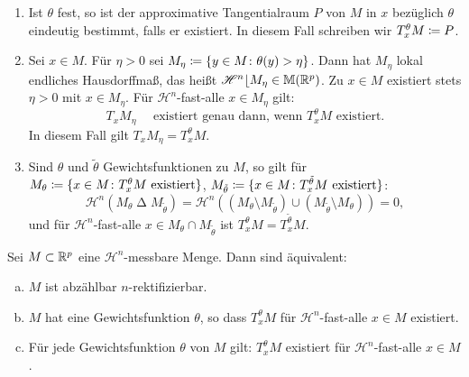 \documentclass[a4paper,twoside,DIV15,BCOR12mm]{scrbook}
\newcommand{\HM}{\mathscr H}
\newcommand{\MR}{\lfloor}
\begin{document}
\begin{bemerkungen}
\begin{enumerate}[(1)]
\item Ist \(\theta\) fest, so ist der approximative Tangentialraum \(P\) von \(M\) in \(x\) bezüglich \(\theta\) eindeutig bestimmt, falls er existiert. In diesem Fall schreiben wir \(T_x^\theta M \da P\).
\item Sei \(x\in M\). Für \(\eta>0\) sei \(M_\eta \da \{y\in M \colon \theta(y) > \eta\}\). Dann hat \(M_\eta\) lokal endliches Hausdorffmaß, das heißt \(\HM^n\MR M_\eta \in \mathbb M(\MdR^p)\). Zu \(x\in M\) existiert stets \(\eta>0\) mit \(x \in M_\eta\). Für \(\HM^n\)-fast-alle \(x\in M_\eta\) gilt:
\[
T_x M_\eta \quad \text{ existiert genau dann, wenn }T_x^\theta M \text{ existiert.}
\]
In diesem Fall gilt $T_x M_\eta = T_x^\theta M$.
\item Sind \(\theta\) und \(\tilde\theta\) Gewichtsfunktionen zu \(M\), so gilt für \(M_\theta \da \{x\in M \colon T_x^\theta M \text{ existiert}\}\), \(M_{\tilde\theta} \da \{x\in M \colon T_x^{\tilde\theta} M 
\text{ existiert}\}\):
\[
\HM^n(M_\theta \mathop\Delta M_{\tilde\theta}) = \HM^n\left( (M_\theta \setminus M_{\tilde\theta}) \cup (M_{\tilde\theta} \setminus M_\theta) \right) = 0,
\]
und für \(\HM^n\)-fast-alle \(x \in M_\theta \cap M_{\tilde\theta}\) ist \(T_x^\theta M = T_x^{\tilde\theta}M\).
\end{enumerate}
\end{bemerkungen}

\begin{satz}\label{satz:3.24}
Sei \(M \subset \mathbb{R}^p\) eine \(\HM^n\)-messbare Menge. Dann sind äquivalent:
\begin{enumerate}[(a)]
\item \(M\) ist abzählbar \(n\)-rektifizierbar.
\item \(M\) hat eine Gewichtsfunktion \(\theta\), so dass \(T_x^\theta M\) für \(\HM^n\)-fast-alle \(x \in M\) existiert.
\item Für jede Gewichtsfunktion \(\theta\) von \(M\) gilt: \(T_x^\theta M\) existiert für \(\HM^n\)-fast-alle \(x\in M\).
\end{enumerate}
\end{satz}
\end{document}
